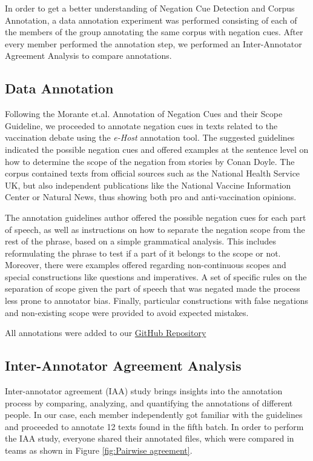 In order to get a better understanding of Negation Cue Detection and Corpus Annotation, a data annotation experiment was performed consisting of each of the members of the group annotating the same corpus with negation cues. After every member performed the annotation step, we performed an Inter-Annotator Agreement Analysis to compare annotations. 
\subsection*{Data Annotation}
Following the Morante et.al. \cite{morante2011annotation} Annotation of Negation Cues and their Scope Guideline, we proceeded to annotate negation cues in texts related to the vaccination debate using the \textit{e-Host} annotation tool. The suggested guidelines indicated the possible negation cues and offered examples at the sentence level on how to determine the scope of the negation from stories by Conan Doyle.  The corpus contained texts from official sources such as the National Health Service UK, but also independent publications like the National Vaccine Information Center or Natural News, thus showing both pro and anti-vaccination opinions. 

The annotation guidelines author offered the possible negation cues for each part of speech, as well as instructions on how to separate the negation scope from the rest of the phrase, based on a simple grammatical analysis. This includes reformulating the phrase to test if a part of it belongs to the scope or not. Moreover, there were examples offered regarding non-continuous scopes and special constructions like questions and imperatives. A set of specific rules on the separation of scope given the part of speech that was negated made the process less prone to annotator bias.
Finally, particular constructions with false negations and non-existing scope were provided to avoid expected mistakes.

All annotations were added to our \href{https://github.com/Sergi095/Applied-Text-Mining-VU-Course-2023-}{GitHub Repository}

\subsection*{Inter-Annotator Agreement Analysis}
Inter-annotator agreement (IAA) study brings insights into the annotation process by comparing, analyzing, and quantifying the annotations of different people. In our case, each member independently got familiar with the guidelines and proceeded to annotate 12 texts found in the fifth batch. In order to perform the IAA study, everyone shared their annotated files, which were compared in teams as shown in Figure \ref{fig:Pairwise agreement}.

